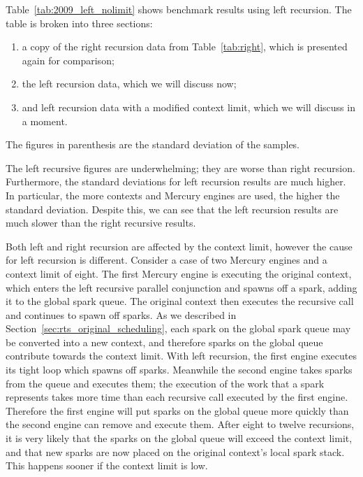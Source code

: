 Table~\ref{tab:2009_left_nolimit} shows benchmark results using left
recursion.
The table is broken into three sections:

\begin{enumerate}

\item
a copy of the right recursion data from Table~\ref{tab:right},
which is presented again for comparison;

\item
the left recursion data,
which we will discuss now;

\item
and left recursion data with a modified context limit,
which we will discuss in a moment.

\end{enumerate}

\noindent
The figures in parenthesis are the standard deviation of the samples.

The left recursive figures are underwhelming;
they are worse than right recursion.
Furthermore,
the standard deviations for left recursion results are much
higher.
In particular,
the more contexts and Mercury engines are used,
the higher the standard deviation.
Despite this,
we can see that the left recursion results are much slower than the right
recursive results.

Both left and right recursion are affected by the context limit,
however the cause for left recursion is different.
Consider a case of two Mercury engines and a context limit of eight.
The first Mercury engine is executing the original context,
which enters the left recursive parallel conjunction and spawns off a spark,
adding it to the global spark queue.
The original context then executes the recursive call and
continues to spawn off sparks.
As we described in Section~\ref{sec:rts_original_scheduling},
each spark on the global spark queue may be converted into a new
context,
and therefore sparks on the global queue contribute towards the context
limit.
With left recursion,
the first engine executes its tight loop which spawns off sparks.
Meanwhile the second engine takes sparks from the queue and executes them;
the execution of the work that a spark represents takes more time than each
recursive call executed by the first engine.
Therefore the first engine will put sparks on the global queue more quickly
than the second engine can remove and execute them.
After eight to twelve recursions,
it is very likely that the sparks on the global queue will exceed the
context limit,
and that new sparks are now placed on the original context's local spark
stack.
This happens sooner if the context limit is low.

